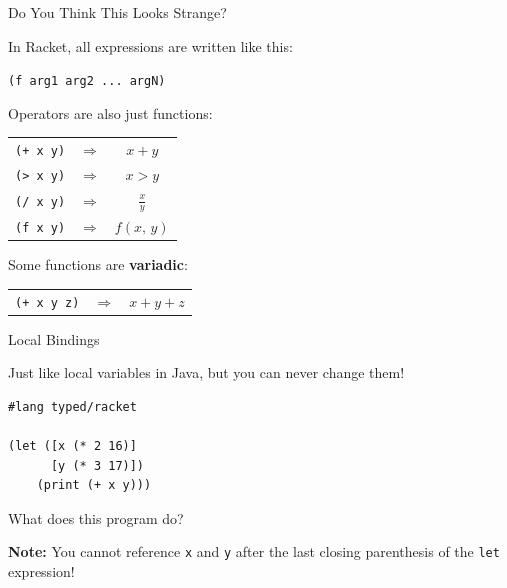\documentclass{beamer}
\begin{document}
\begin{frame}[fragile]{Do You Think This Looks Strange?}

  In Racket, all expressions are written like this:

  \begin{center}
    \lstinline{(f arg1 arg2 ... argN)}
  \end{center}

  \pause{}

  Operators are also just functions:

  \begin{center}
    \begin{tabular}{ccc}
      \lstinline{(+ x y)} & $\Rightarrow$ & $x + y$ \\
      \lstinline{(> x y)} & $\Rightarrow$ & $x > y$ \\
      \lstinline{(/ x y)} & $\Rightarrow$ & $\frac{x}{y}$ \\
      \lstinline{(f x y)} & $\Rightarrow$ & $f(x, \, y)$
    \end{tabular}
  \end{center}

  \pause{}

  Some functions are \textbf{variadic}:

  \begin{center}
    \begin{tabular}{ccc}
      \lstinline{(+ x y z)} & $\Rightarrow$ & $x + y + z$
    \end{tabular}
  \end{center}

\end{frame}

\begin{frame}[fragile]{Local Bindings}

Just like local variables in Java, but you can never change them!

\begin{lstlisting}
#lang typed/racket

(let ([x (* 2 16)]
      [y (* 3 17)])
    (print (+ x y)))
\end{lstlisting}

What does this program do?

\vspace{1cm}

\textbf{Note:} You cannot reference \lstinline{x} and \lstinline{y} after the last closing parenthesis of the \lstinline{let} expression!

\end{frame}
\end{document}
